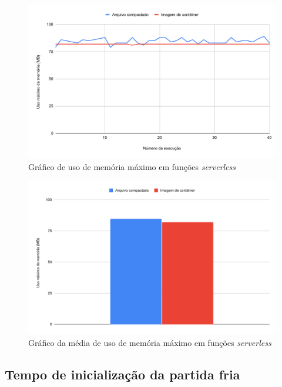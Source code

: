 \documentclass[conference]{IEEEtran}
\begin{document}
\begin{figure}[H]
    \centering 
    \includegraphics [width=\linewidth]{images/max-memory-use-PT.pdf}
    \par
    \caption{Gráfico de uso de memória máximo em funções \textit{serverless}}
    \label{graph:functions_max_memory_used}
\end{figure}

\begin{figure}[H]
    \centering 
    \includegraphics [width=\linewidth]{images/max-memory-use-average-PT.pdf}
    \par
    \caption{Gráfico da média de uso de memória máximo em funções \textit{serverless}}
    \label{graph:functions_max_memory_used_average}
\end{figure}

\subsection{Tempo de inicialização da partida fria} 
\label{subsec:cold_start_time}
\end{document}
